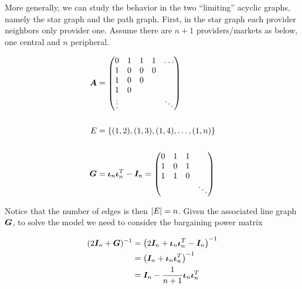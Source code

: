 More generally, we can study the behavior in the two ``limiting'' acyclic graphs, namely the star graph and the path graph. First, in the star graph each provider neighbors only provider one. Assume there are $n + 1$ providers/markets as below, one central and $n$ peripheral.

\vspace{5mm}
\begin{minipage}{.5\textwidth}
  \resizebox{\textwidth}{!}{}
\end{minipage}
\begin{minipage}{.5\textwidth}
  \begin{equation*}
    \begin{split}
      \matr{A} &= \begin{pmatrix}
        0      & 1 & 1 & 1 & \ldots \\
        1      & 0 & 0 & 0 &        \\
        1      & 0 & 0 &   &        \\
        1      & 0 &   &   &        \\
        \vdots &   &   &   & \ddots
      \end{pmatrix} \\
      \vspace{5mm} \\
      E &= \set{(1, 2), (1, 3), (1, 4), \ldots, (1, n)} \\
      \vspace{5mm} \\
      \G &= \matr{\iota}_n \matr{\iota}_n^T - \I_n =  \begin{pmatrix}
        0 & 1 & 1 &        \\
        1 & 0 & 1 &        \\
        1 & 1 & 0 &        \\
          &   &   & \ddots
      \end{pmatrix}
    \end{split}
  \end{equation*}
\end{minipage}
\vspace{5mm}

Notice that the number of edges is then $\lvert E\rvert = n$. Given the associated line graph $\bm{G}$, to solve the model we need to consider the bargaining power matrix

\begin{equation*}
  \begin{split}
    (2\bm{I}_n + \bm{G})^{-1} &= \left( 2\bm{I}_n + \bm{\iota}_n \bm{\iota}_n^T - \bm{I}_n \right)^{-1}\\
    &= \left( \bm{I}_n + \bm{\iota}_n \bm{\iota}_n^T \right)^{-1} \\
    &= \bm{I}_n - \frac{1}{n + 1} \bm{\iota}_n \bm{\iota}_n^T
  \end{split}
\end{equation*}

